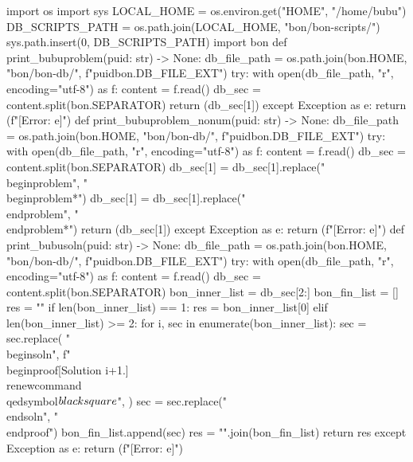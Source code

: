 \begin{pycode}
import os
import sys
LOCAL_HOME = os.environ.get("HOME", "/home/bubu")
DB_SCRIPTS_PATH = os.path.join(LOCAL_HOME, "bon/bon-scripts/")
sys.path.insert(0, DB_SCRIPTS_PATH)
import bon
def print_bubuproblem(puid: str) -> None:
    db_file_path = os.path.join(bon.HOME, "bon/bon-db/", f"{puid}{bon.DB_FILE_EXT}")
    try:
        with open(db_file_path, "r", encoding="utf-8") as f:
            content = f.read()
        db_sec = content.split(bon.SEPARATOR)
        return (db_sec[1])
    except Exception as e:
        return (f"[Error: {e}]")
def print_bubuproblem_nonum(puid: str) -> None:
    db_file_path = os.path.join(bon.HOME, "bon/bon-db/", f"{puid}{bon.DB_FILE_EXT}")
    try:
        with open(db_file_path, "r", encoding="utf-8") as f:
            content = f.read()
        db_sec = content.split(bon.SEPARATOR)
        db_sec[1] = db_sec[1].replace("\\begin{problem}", "\\begin{problem*}")
        db_sec[1] = db_sec[1].replace("\\end{problem}", "\\end{problem*}")
        return (db_sec[1])
    except Exception as e:
        return (f"[Error: {e}]")
def print_bubusoln(puid: str) -> None:
    db_file_path = os.path.join(bon.HOME, "bon/bon-db/", f"{puid}{bon.DB_FILE_EXT}")
    try:
        with open(db_file_path, "r", encoding="utf-8") as f:
            content = f.read()
        db_sec = content.split(bon.SEPARATOR)
        bon_inner_list = db_sec[2:]
        bon_fin_list = []
        res = ""
        if len(bon_inner_list) == 1:
            res = bon_inner_list[0]
        elif len(bon_inner_list) >= 2:
            for i, sec in enumerate(bon_inner_list):
                sec = sec.replace(
                    "\\begin{soln}",
                    f"\\begin{{proof}}[Solution {i+1}.]\\renewcommand{{\\qedsymbol}}{{$\\blacksquare$}}",
                )
                sec = sec.replace("\\end{soln}", "\\end{proof}")
                bon_fin_list.append(sec)
            res = "\n".join(bon_fin_list)
        return res
    except Exception as e:
        return (f"[Error: {e}]")
\end{pycode}
